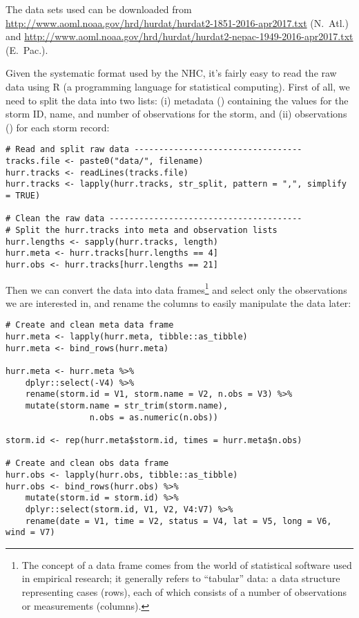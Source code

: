 The data sets used can be downloaded from \url{http://www.aoml.noaa.gov/hrd/hurdat/hurdat2-1851-2016-apr2017.txt} (N.~Atl.) and \url{http://www.aoml.noaa.gov/hrd/hurdat/hurdat2-nepac-1949-2016-apr2017.txt} (E.~Pac.).

\sk
Given the systematic format used by the NHC, it's fairly easy to read the raw data using R (a programming language for statistical computing). First of all, we need to split the data into two lists: (i) metadata () containing the values for the storm ID, name, and number of observations for the storm, and (ii) observations () for each storm record:
\begin{lstlisting}[caption=Read and clean raw data, label=snp:hurdat-read]
# Read and split raw data ----------------------------------
tracks.file <- paste0("data/", filename)
hurr.tracks <- readLines(tracks.file)
hurr.tracks <- lapply(hurr.tracks, str_split, pattern = ",", simplify = TRUE)

# Clean the raw data ---------------------------------------
# Split the hurr.tracks into meta and observation lists
hurr.lengths <- sapply(hurr.tracks, length)
hurr.meta <- hurr.tracks[hurr.lengths == 4]
hurr.obs <- hurr.tracks[hurr.lengths == 21]
\end{lstlisting}

Then we can convert the data into data frames\footnote{The concept of a data frame comes from the world of statistical software used in empirical research; it generally refers to “tabular” data: a data structure representing cases (rows), each of which consists of a number of observations or measurements (columns).} and select only the observations we are interested in, and rename the columns to easily manipulate the data later:
\begin{lstlisting}[caption=Create data frames and select observations, label=snp:hurdat-clean]
# Create and clean meta data frame
hurr.meta <- lapply(hurr.meta, tibble::as_tibble)
hurr.meta <- bind_rows(hurr.meta)

hurr.meta <- hurr.meta %>%
	dplyr::select(-V4) %>%
	rename(storm.id = V1, storm.name = V2, n.obs = V3) %>%
	mutate(storm.name = str_trim(storm.name),
				 n.obs = as.numeric(n.obs))

storm.id <- rep(hurr.meta$storm.id, times = hurr.meta$n.obs)

# Create and clean obs data frame
hurr.obs <- lapply(hurr.obs, tibble::as_tibble)
hurr.obs <- bind_rows(hurr.obs) %>%
	mutate(storm.id = storm.id) %>%
	dplyr::select(storm.id, V1, V2, V4:V7) %>%
	rename(date = V1, time = V2, status = V4, lat = V5, long = V6, wind = V7)
\end{lstlisting}


